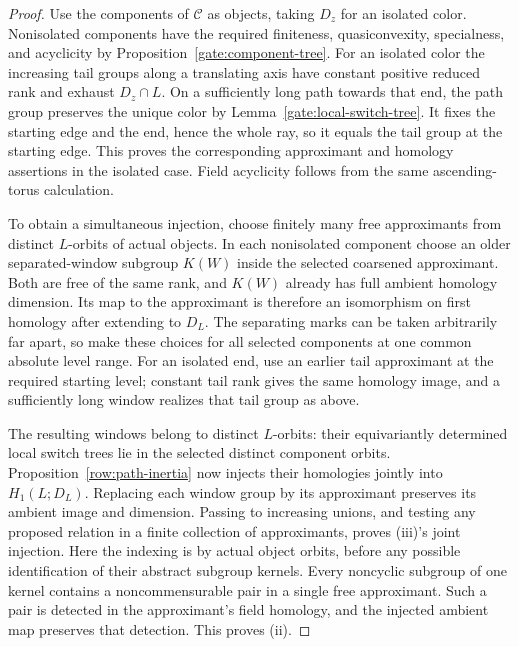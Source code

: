 \begin{proof}
Use the components of $\mathcal C$ as objects, taking $D_z$ for an isolated
color.  Nonisolated components have the required finiteness, quasiconvexity,
specialness, and acyclicity by Proposition~\ref{gate:component-tree}.
For an isolated color the increasing tail groups along a translating
axis have constant positive reduced rank and exhaust $D_z\cap L$.
On a sufficiently long path towards that end, the path group preserves
the unique color by Lemma~\ref{gate:local-switch-tree}.  It fixes the
starting edge and the end, hence the whole ray, so it equals the tail
group at the starting edge.  This proves the corresponding approximant
and homology assertions in the isolated case.  Field acyclicity follows
from the same ascending-torus calculation.

To obtain a simultaneous injection, choose finitely many free
approximants from distinct \(L\)-orbits of actual objects. In each
nonisolated component choose an older separated-window subgroup
\(K(W)\) inside the selected coarsened approximant. Both are free
of the same rank, and \(K(W)\) already has full ambient homology
dimension. Its map to the approximant is therefore an isomorphism
on first homology after extending to \(D_L\). The separating marks
can be taken arbitrarily far apart, so make these choices for all
selected components at one common absolute level range. For an
isolated end, use an earlier tail approximant at the required
starting level; constant tail rank gives the same homology image,
and a sufficiently long window realizes that tail group as above.

The resulting windows belong to distinct \(L\)-orbits: their
equivariantly determined local switch trees lie in the selected
distinct component orbits. Proposition~\ref{row:path-inertia} now
injects their homologies jointly into \(H_1(L;D_L)\). Replacing each
window group by its approximant preserves its ambient image and
dimension. Passing to increasing unions, and testing any proposed
relation in a finite collection of approximants, proves (iii)'s
joint injection. Here the indexing is by actual object orbits,
before any possible identification of their abstract subgroup kernels. Every
noncyclic subgroup of one kernel contains a noncommensurable pair in a
single free approximant.  Such a pair is detected in the approximant's
field homology, and the injected ambient map preserves that detection.
This proves (ii).


\end{proof}
